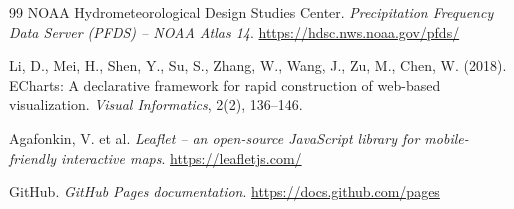 \begin{thebibliography}{99}
NOAA Hydrometeorological Design Studies Center. \textit{Precipitation Frequency Data Server (PFDS) -- NOAA Atlas 14}. \url{https://hdsc.nws.noaa.gov/pfds/}

Li, D., Mei, H., Shen, Y., Su, S., Zhang, W., Wang, J., Zu, M., Chen, W. (2018). ECharts: A declarative framework for rapid construction of web-based visualization. \textit{Visual Informatics}, 2(2), 136--146.

Agafonkin, V. et al. \textit{Leaflet -- an open-source JavaScript library for mobile-friendly interactive maps}. \url{https://leafletjs.com/}

GitHub. \textit{GitHub Pages documentation}. \url{https://docs.github.com/pages}

\end{thebibliography}
\endgroup
